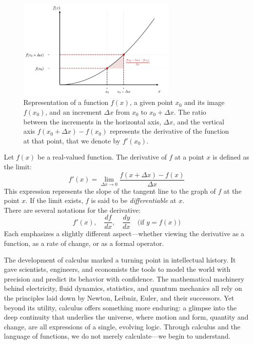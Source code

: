 \documentclass{book}
\begin{document}
\begin{figure}[ht]
    \centering
    \includegraphics[width=0.7\textwidth]{figures/appendix/functions_point_2_shadow.png}
    \caption{Representation of a function $f(x)$, a given point $x_0$ and its image $f(x_0)$, and an increment $\Delta x$ from $x_0$ to $x_0 + \Delta x$. The ratio between the increments in the horizontal axis, $\Delta x$, and the vertical axis $f(x_0 + \Delta x) - f(x_0)$ represents the derivative of the function at that point, that we denote by $f'(x_0)$.}
    \label{fig:functions_point_2_shadow}
\end{figure}

Let \( f(x) \) be a real-valued function. The derivative of \( f \) at a point \( x \) is defined as the limit:
\[
f'(x) = \lim_{\Delta x \to 0} \frac{f(x + \Delta x) - f(x)}{\Delta x}
\]
This expression represents the slope of the tangent line to the graph of \( f \) at the point \( x \). If the limit exists, \( f \) is said to be \emph{differentiable} at \( x \).\\

There are several notations for the derivative:
\[
f'(x), \quad \frac{df}{dx}, \quad \frac{dy}{dx} \quad \text{(if } y = f(x) \text{)}
\]
Each emphasizes a slightly different aspect—whether viewing the derivative as a function, as a rate of change, or as a formal operator.

The development of calculus marked a turning point in intellectual history. It gave scientists, engineers, and economists the tools to model the world with precision and predict its behavior with confidence. The mathematical machinery behind electricity, fluid dynamics, statistics, and quantum mechanics all rely on the principles laid down by Newton, Leibniz, Euler, and their successors. Yet beyond its utility, calculus offers something more enduring: a glimpse into the deep continuity that underlies the universe, where motion and form, quantity and change, are all expressions of a single, evolving logic. Through calculus and the language of functions, we do not merely calculate---we begin to understand.\\
\end{document}
